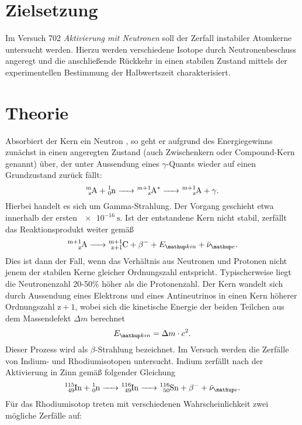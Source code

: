 \setcounter{page}{1}
\section*{Zielsetzung}
Im Versuch 702 \textit{Aktivierung mit Neutronen} soll der Zerfall instabiler Atomkerne untersucht werden.
Hierzu werden verschiedene Isotope durch Neutronenbeschuss angeregt und die anschließende Rückkehr in einen
stabilen Zustand mittels der experimentellen Bestimmung der Halbwertszeit charakterisiert.
\section{Theorie}
Absorbiert der Kern  ein Neutron , so geht er aufgrund des Energiegewinns
zunächst in einen angeregten Zustand (auch Zwischenkern oder Compound-Kern genannt) über, der unter Aussendung eines $\gamma$-Quants wieder
auf einen Grundzustand zurück fällt:
\begin{equation}
  \ce{^m_z A + ^1_0 n -> ^{m+1}_z A^* -> ^{m+1}_z A }+ \gamma.
\end{equation}
Hierbei handelt es sich um Gamma-Strahlung. Der Vorgang geschieht etwa innerhalb der ersten $\SI{e-16}{\second}$.
Ist der entstandene Kern 
nicht stabil, zerfällt das Reaktionsprodukt weiter gemäß
\begin{equation}
  \ce{^{m+1}_z A -> ^{m+1}_{z+1} C }+ \beta^{-} + E\ua{kin} + \bar{\nu}\ua{e}.
\end{equation}
Dies ist dann der Fall, wenn das Verhältnis aus Neutronen und Protonen nicht jenem der stabilen Kerne gleicher Ordnungszahl entspricht.
Typischerweise liegt die Neutronenzahl 20-50\% höher als die Protonenzahl.
Der Kern wandelt sich durch Aussendung eines Elektrons und eines Antineutrinos in einen Kern höherer Ordnungszahl $\mathup{z} + 1$, wobei
sich die kinetische Energie der beiden Teilchen aus dem Massendefekt $\Delta m$ berechnet
\begin{equation}
  E\ua{kin} = \Delta m \cdot c^2.
\end{equation}
Dieser Prozess wird als $\beta$-Strahlung bezeichnet. Im Versuch werden die Zerfälle von Indium- und Rhodiumisotopen untersucht.
Indium zerfällt nach der Aktivierung in Zinn gemäß folgender Gleichung
\begin{equation}
  \ce{^115_49 In + ^1_0 n ->^116_49 In -> ^116_50 Sn} + \beta^- + \bar{\nu}\ua{e}.
\end{equation}
Für das Rhodiumisotop treten mit verschiedenen Wahrscheinlichkeit zwei mögliche Zerfälle auf:
